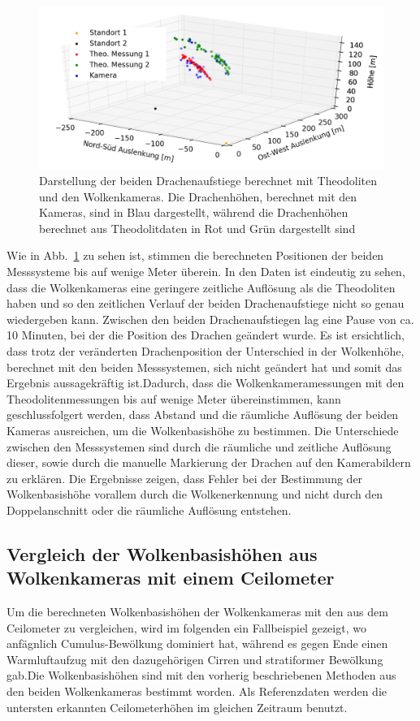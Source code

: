 \documentclass[a4paper,11pt,twoside,german]{article}
\newcommand{\absatz}{\smallbreak}
\begin{document}
\begin{figure}[h]
	\begin{center}
		\includegraphics[width=1\textwidth]{media/dragon_theo.png}
		\caption[Drachenaufstieg]{Darstellung der beiden Drachenaufstiege berechnet mit Theodoliten und den Wolkenkameras.  Die Drachenhöhen, berechnet mit den Kameras, sind in Blau dargestellt, während die Drachenhöhen berechnet aus Theodolitdaten in Rot und Grün dargestellt sind}
		\label{FIGTheoDragon}
	\end{center}
\end{figure}

Wie in Abb.~\ref{FIGTheoDragon} zu sehen ist, stimmen die berechneten Positionen
der beiden Messsysteme bis auf wenige Meter überein. In den Daten ist eindeutig
zu sehen, dass die Wolkenkameras eine geringere zeitliche Auflösung als die
Theodoliten haben und so den zeitlichen Verlauf der beiden Drachenaufstiege
nicht so genau wiedergeben kann. Zwischen den beiden Drachenaufstiegen lag eine
Pause von ca. 10 Minuten, bei der die Position des Drachen geändert wurde. Es
ist ersichtlich, dass trotz der veränderten Drachenposition der Unterschied in
der Wolkenhöhe, berechnet mit den beiden Messsystemen, sich nicht geändert hat
und somit das Ergebnis aussagekräftig ist.\absatz Dadurch, dass die
Wolkenkameramessungen mit den Theodolitenmessungen bis auf wenige Meter
übereinstimmen, kann geschlussfolgert werden, dass Abstand und die räumliche
Auflösung der beiden Kameras ausreichen, um die Wolkenbasishöhe zu bestimmen.
Die Unterschiede zwischen den Messsystemen sind durch die räumliche und
zeitliche Auflösung dieser, sowie durch die manuelle Markierung der Drachen auf
den Kamerabildern zu erklären. Die Ergebnisse zeigen, dass Fehler bei der
Bestimmung der Wolkenbasishöhe vorallem durch die Wolkenerkennung und nicht
durch den Doppelanschnitt oder die räumliche Auflösung entstehen.

\subsection{Vergleich der Wolkenbasishöhen aus Wolkenkameras mit einem Ceilometer}
\label{SECCeilo}
Um die berechneten Wolkenbasishöhen der Wolkenkameras mit den aus dem Ceilometer
zu vergleichen, wird im folgenden ein Fallbeispiel gezeigt, wo anfägnlich
Cumulus-Bewölkung dominiert hat, während es gegen Ende einen Warmluftaufzug mit
den dazugehörigen Cirren und stratiformer Bewölkung gab.\absatz Die
Wolkenbasishöhen sind mit den vorherig beschriebenen Methoden aus den beiden
Wolkenkameras bestimmt worden. Als Referenzdaten werden die untersten erkannten
Ceilometerhöhen im gleichen Zeitraum benutzt.\absatz
\end{document}
